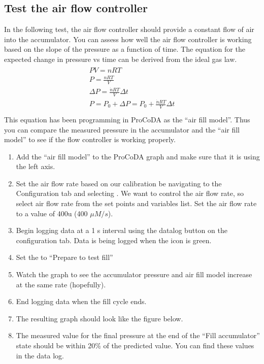 \documentclass[letterpaper,10pt,english]{sphinxmanual}
\begin{document}
\subsection{Test the air flow controller}
\label{\detokenize{Gas_Transfer/Gas_Transfer:test-the-air-flow-controller}}
In the following test, the air flow controller should provide a constant flow of air into the accumulator. You can assess how well the air flow controller is working based on the slope of the pressure as a function of time. The equation for the expected change in pressure vs time can be derived from the ideal gas law.
\begin{align}\label{equation:Gas_Transfer/Gas_Transfer:Gas_Transfer/Gas_Transfer:8}\!\begin{aligned}
PV = nRT\\
P = \frac{nRT}{V}\\
\Delta P = \frac{\dot{n}RT}{V}\Delta t\\
P = P_{0} + \Delta P = P_{0} +\frac{\dot{n}RT}{V}\Delta t\\
\end{aligned}\end{align}
This equation has been programming in ProCoDA as the “air fill model”. Thus you can compare the measured pressure in the accumulator and the “air fill model” to see if the flow controller is working properly.
\begin{enumerate}
\item {} 
Add the “air fill model” to the ProCoDA graph and make sure that it is using the left axis.

\item {} 
Set the air flow rate based on our calibration be navigating to the Configuration tab and selecting . We want to control the air flow rate, so select air flow rate from the set points and variables list. Set the air flow rate to a value of 400u (400 \(\mu M/s\)).

\item {} 
Begin logging data at a 1 s interval using the  datalog button on the configuration tab. Data is being logged when the icon is green.

\item {} 
Set the  to “Prepare to test fill”

\item {} 
Watch the graph to see the accumulator pressure and air fill model increase at the same rate (hopefully).

\item {} 
End logging data when the fill cycle ends.

\item {} 
The resulting graph should look like the figure below.

\item {} 
The measured value for the final pressure at the end of the “Fill accumulator” state should be within 20\% of the predicted value. You can find these values in the data log.

\end{enumerate}
\end{document}
